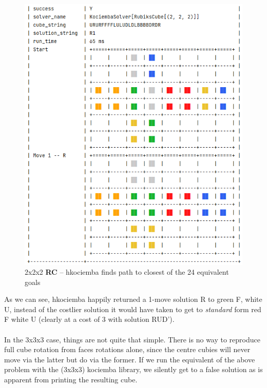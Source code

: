 \begin{figure}[H]
\centering
\includegraphics[scale=0.6]{./Figures/KociembaBug222}
\caption[Kociemba Bug]{2x2x2 \textbf{RC} -- hkociemba finds path to closest of the 24 equivalent goals}
\label{fig:KociembaBug222}
\end{figure}
As we can see, hkociemba happily returned a 1-move solution R to green F, white U, instead of the costlier solution it would have taken to get to \textit{standard} form red F white U (clearly at a cost of 3 with solution RUD').
\\
\\
In the 3x3x3 case, things are not quite that simple. There is no way to reproduce full cube rotation from faces rotations alone, since the centre cubies will never move via the latter but do via the former. If we run the equivalent of the above problem with the (3x3x3) kociemba library, we silently get to a false solution as is apparent from printing the resulting cube.
\afblue

